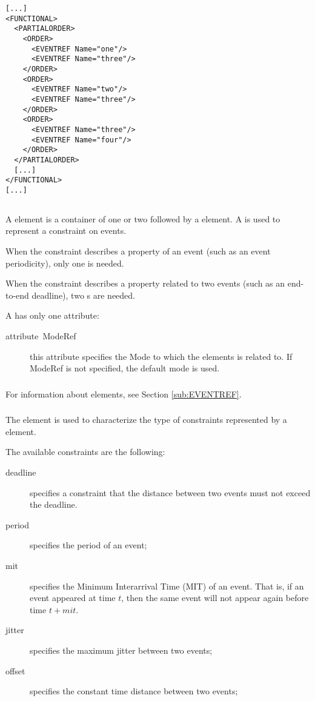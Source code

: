\begin{lstlisting}
[...]
<FUNCTIONAL>
  <PARTIALORDER>
    <ORDER>
      <EVENTREF Name="one"/>
      <EVENTREF Name="three"/>
    </ORDER>
    <ORDER>
      <EVENTREF Name="two"/>
      <EVENTREF Name="three"/>
    </ORDER>
    <ORDER>
      <EVENTREF Name="three"/>
      <EVENTREF Name="four"/>
    </ORDER>
  </PARTIALORDER>
  [...]
</FUNCTIONAL>
[...]
\end{lstlisting}

\subsection{}

A  element is a container of one or two
 followed by a  element. A
 is used to represent a constraint on events.

When the constraint describes a property of an event (such as an event
periodicity), only one  is needed.

When the constraint describes a property related to two events (such
as an end-to-end deadline), two s are needed.

A  has only one attribute:
\begin{description}
\item [{attribute~ModeRef}] this attribute specifies the Mode to which
  the  elements is related to. If ModeRef is not
  specified, the default mode is used.
\end{description}


\subsubsection{}

For information about  elements, see Section
\ref{sub:EVENTREF}.


\subsubsection{}

The  element is used to characterize the type of
constraints represented by a  element.

The available constraints are the following:

\begin{description}
\item [{deadline}] specifies a constraint that the distance between
  two events must not exceed the deadline.
\item [{period}] specifies the period of an event;
\item [{mit}] specifies the Minimum Interarrival Time (MIT) of an
  event.  That is, if an event appeared at time $t$, then the same
  event will not appear again before time $t+mit$.
\item [{jitter}] specifies the maximum jitter between two events;
\item [{offset}] specifies the constant time distance between two
  events;
\end{description}

